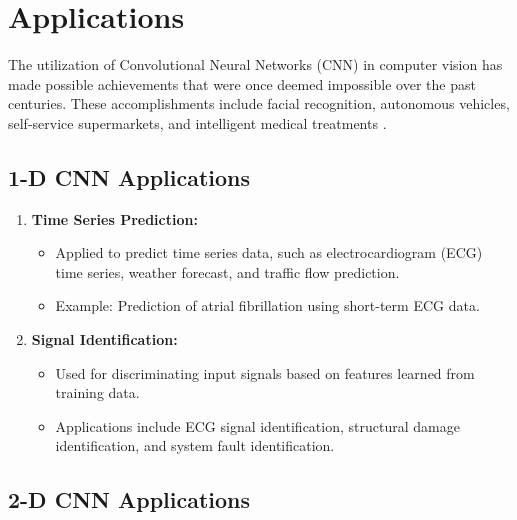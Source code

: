 \section{Applications}

The utilization of Convolutional Neural Networks (CNN) in computer vision has made possible achievements that were once deemed impossible over the past centuries. These accomplishments include facial recognition, autonomous vehicles, self-service supermarkets, and intelligent medical treatments \cite{Li:2021}.

\subsection{1-D CNN Applications}

\begin{enumerate}
	\item \textbf{Time Series Prediction:}
	\begin{itemize}
		\item Applied to predict time series data, such as electrocardiogram (ECG) time series, weather forecast, and traffic flow prediction.
		\item Example: Prediction of atrial fibrillation using short-term ECG data.
	\end{itemize}
	
	\item \textbf{Signal Identification:}
	\begin{itemize}
		\item Used for discriminating input signals based on features learned from training data.
		\item Applications include ECG signal identification, structural damage identification, and system fault identification.
	\end{itemize}
\end{enumerate}

\subsection{2-D CNN Applications}

